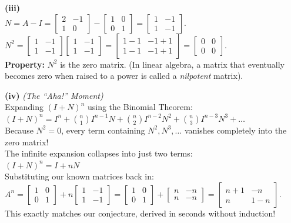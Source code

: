 \begin{solution}
\medskip
\textbf{(iii)} \\
$N = A - I = \begin{bmatrix} 2 & -1 \\ 1 & 0 \end{bmatrix} - \begin{bmatrix} 1 & 0 \\ 0 & 1 \end{bmatrix} = \begin{bmatrix} 1 & -1 \\ 1 & -1 \end{bmatrix}$. \\
$N^2 = \begin{bmatrix} 1 & -1 \\ 1 & -1 \end{bmatrix} \begin{bmatrix} 1 & -1 \\ 1 & -1 \end{bmatrix} = \begin{bmatrix} 1-1 & -1+1 \\ 1-1 & -1+1 \end{bmatrix} = \begin{bmatrix} 0 & 0 \\ 0 & 0 \end{bmatrix}$. \\
\textbf{Property:} $N^2$ is the zero matrix. (In linear algebra, a matrix that eventually becomes zero when raised to a power is called a \textit{nilpotent} matrix).

\medskip
\textbf{(iv)} \textit{(The ``Aha!'' Moment)} \\
Expanding $(I+N)^n$ using the Binomial Theorem: \\
$(I+N)^n = I^n + \binom{n}{1}I^{n-1}N + \binom{n}{2}I^{n-2}N^2 + \binom{n}{3}I^{n-3}N^3 + \dots$ \\
Because $N^2 = 0$, every term containing $N^2, N^3, \dots$ vanishes completely into the zero matrix! \\
The infinite expansion collapses into just two terms: \\
$(I+N)^n = I + nN$ \\
Substituting our known matrices back in: \\
$A^n = \begin{bmatrix} 1 & 0 \\ 0 & 1 \end{bmatrix} + n \begin{bmatrix} 1 & -1 \\ 1 & -1 \end{bmatrix} = \begin{bmatrix} 1 & 0 \\ 0 & 1 \end{bmatrix} + \begin{bmatrix} n & -n \\ n & -n \end{bmatrix} = \begin{bmatrix} n+1 & -n \\ n & 1-n \end{bmatrix}$. \\
This exactly matches our conjecture, derived in seconds without induction!
\end{solution}

